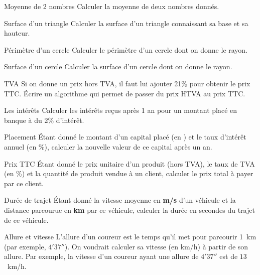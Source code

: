 \begin{Exercice}{Moyenne de 2 nombres}
	Calculer la moyenne de deux nombres donnés.
\end{Exercice}

\begin{Exercice}{Surface d’un triangle}
	Calculer la surface d’un triangle connaissant sa base et sa hauteur.
\end{Exercice}

\begin{Exercice}{Périmètre d’un cercle}
	Calculer le périmètre d’un cercle dont on donne le rayon. 
\end{Exercice}

\begin{Exercice}{Surface d’un cercle}
	Calculer la surface d’un cercle dont on donne le rayon. 
\end{Exercice}

\begin{Exercice}{TVA}
	Si on donne un prix hors TVA, il faut lui ajouter 21\% 
	pour obtenir le prix TTC. Écrire un algorithme qui permet 
	de passer du prix HTVA au prix TTC.
\end{Exercice}

\begin{Exercice}{Les intérêts}
	Calculer les intérêts reçus après 1 an pour un montant placé en 
	banque à du 2\% d’intérêt.
\end{Exercice}

\begin{Exercice}{Placement}
	Étant donné le montant d’un capital placé (en \texteuro) 
	et le taux d’intérêt annuel (en \%), 
	calculer la nouvelle valeur de ce capital après un an.
\end{Exercice}

\begin{Exercice}{Prix TTC}
	Étant donné le prix unitaire d’un produit
	(hors TVA), le taux de TVA (en \%) et la quantité de produit vendue à
	un client, calculer le prix total à payer par ce client.
\end{Exercice}

\begin{Exercice}{Durée de trajet}
	Étant donné la vitesse moyenne en \textbf{m/s}
	d’un véhicule et la distance parcourue en \textbf{km} par ce véhicule,
	calculer la durée en secondes du trajet de ce véhicule.
\end{Exercice}

\begin{Exercice}{Allure et vitesse}
	L’allure d’un coureur est le temps qu’il met pour parcourir 1~km
	(par exemple, $4'37''$).
	On voudrait calculer sa vitesse (en km/h) à partir de son allure.
	Par exemple, la vitesse d’un coureur ayant une allure de
	$4'37''$ est de $13$~km/h. 
\end{Exercice}

